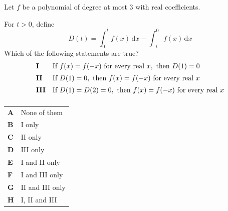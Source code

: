 \documentclass[11pt,a4paper]{article}
\begin{document}
\begin{enumerate}[label=\textbf{\arabic*.},leftmargin=*,itemsep=0pt,start=20]
\questionitem[Integration]
Let $f$ be a polynomial of degree at most $3$ with real coefficients.

For $t>0$, define
\[
D(t)=\int_0^t f(x)\,\mathrm{d}x-\int_{-t}^0 f(x)\,\mathrm{d}x
\]
Which of the following statements are true?
\[
\begin{array}{@{}ll@{}}
\textbf{I} & \text{If }f(x)=f(-x)\text{ for every real }x,\text{ then }D(1)=0 \\[5pt]
\textbf{II} & \text{If }D(1)=0,\text{ then }f(x)=f(-x)\text{ for every real }x \\[5pt]
\textbf{III} & \text{If }D(1)=D(2)=0,\text{ then }f(x)=f(-x)\text{ for every real }x \\[5pt]
\end{array}
\]

\par\vspace*{12pt}
\begin{tabularx}{\linewidth}{@{}>{\bfseries}l Y@{}}
A &
None of them
\\[0.8em]
B &
I only
\\[0.8em]
C &
II only
\\[0.8em]
D &
III only
\\[0.8em]
E &
I and II only
\\[0.8em]
F &
I and III only
\\[0.8em]
G &
II and III only
\\[0.8em]
H &
I, II and III
\\
\end{tabularx}
\end{enumerate}
\end{document}
